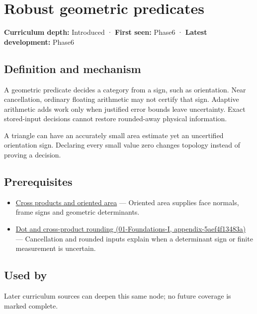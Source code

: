 \hypertarget{appendix-341296fb3f64}{}
\section{Robust geometric predicates}\label{appendix-341296fb3f64-robust-geometric-predicates}

\textbf{Curriculum depth:} Introduced · \textbf{First seen:} Phase6 · \textbf{Latest development:} Phase6

\subsection{Definition and mechanism}\label{appendix-341296fb3f64-definition-and-mechanism}

A geometric predicate decides a category from a sign, such as orientation. Near cancellation, ordinary floating arithmetic may not certify that sign. Adaptive arithmetic adds work only when justified error bounds leave uncertainty. Exact stored-input decisions cannot restore rounded-away physical information.

A triangle can have an accurately small area estimate yet an uncertified orientation sign. Declaring every small value zero changes topology instead of proving a decision.

\subsection{Prerequisites}\label{appendix-341296fb3f64-prerequisites}

\begin{itemize}
\tightlist
\item
  \hyperref[appendix-2391db8052b1]{Cross products and oriented area} --- Oriented area supplies face normals, frame signs and geometric determinants.
\item
  \href{../01-Foundations-I/main.pdf\#nameddest=appendix-5aef4f13483a}{Dot and cross-product rounding (01-Foundations-I, appendix-5aef4f13483a)} --- Cancellation and rounded inputs explain when a determinant sign or finite measurement is uncertain.
\end{itemize}

\subsection{Used by}\label{appendix-341296fb3f64-used-by}

Later curriculum sources can deepen this same node; no future coverage is marked complete.

